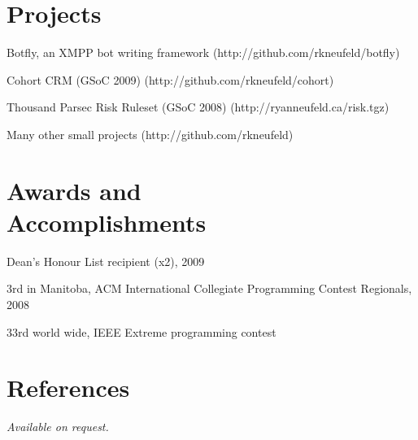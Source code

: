 \documentclass[margin,line,letterpaper]{resume}
\begin{document}
\begin{resume}
  \section{\mysidestyle Projects}

  \begin{list2}
    \item Botfly, an XMPP bot writing framework (http://github.com/rkneufeld/botfly)
    \item Cohort CRM (GSoC 2009) (http://github.com/rkneufeld/cohort)
    \item Thousand Parsec Risk Ruleset (GSoC 2008) (http://ryanneufeld.ca/risk.tgz)
    \item Many other small projects (http://github.com/rkneufeld)
  \end{list2}

  \section{\mysidestyle Awards and\\Accomplishments}

  \begin{list2}
    \item Dean's Honour List recipient (x2), 2009
    \item 3rd in Manitoba, ACM International Collegiate Programming Contest Regionals, 2008
    \item 33rd world wide, IEEE Extreme programming contest
  \end{list2}

  \section{\mysidestyle References}

  {\sl Available on request.}

\end{resume}
\end{document}
